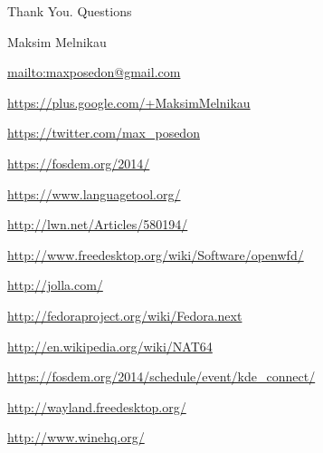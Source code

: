 \documentclass[aspectratio=169]{beamer}
\begin{document}
{

\begin{frame}{Thank You. Questions}
    \begin{block}{Maksim Melnikau}
    \par \url{mailto:maxposedon@gmail.com}
    \par \url{https://plus.google.com/+MaksimMelnikau}
    \par \url{https://twitter.com/max\_posedon}
    \par \url{https://fosdem.org/2014/}
    \par \url{https://www.languagetool.org/}
    \par \url{http://lwn.net/Articles/580194/}
    \par \url{http://www.freedesktop.org/wiki/Software/openwfd/}
    \par \url{http://jolla.com/}
    \par \url{http://fedoraproject.org/wiki/Fedora.next}
    \par \url{http://en.wikipedia.org/wiki/NAT64}
    \par \url{https://fosdem.org/2014/schedule/event/kde\_connect/}
    \par \url{http://wayland.freedesktop.org/}
    \par \url{http://www.winehq.org/}
    \end{block}
\end{frame}
}
\end{document}

